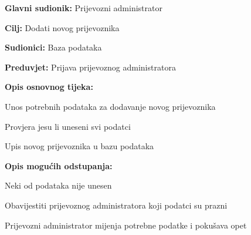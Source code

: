 			\noindent {}
			\begin{packed_item}
				
				\item \textbf{Glavni sudionik: }Prijevozni administrator
				\item  \textbf{Cilj:} Dodati novog prijevoznika
				\item  \textbf{Sudionici:} Baza podataka
				\item  \textbf{Preduvjet:} Prijava prijevoznog administratora
				\item  \textbf{Opis osnovnog tijeka:}
				
				\item[] \begin{packed_enum}
					
					\item Unos potrebnih podataka za dodavanje novog prijevoznika
					\item Provjera jesu li uneseni svi podatci
					\item Upis novog prijevoznika u bazu podataka
				\end{packed_enum}
				
				\item  \textbf{Opis mogućih odstupanja:}
				
				\item[] \begin{packed_item}
					
					\item[2.a] Neki od podataka nije unesen
					\item[] \begin{packed_enum}
						
						\item Obavijestiti prijevoznog administratora koji podatci su prazni
						\item Prijevozni administrator mijenja potrebne podatke i pokušava opet
						
					\end{packed_enum}
					
				\end{packed_item}
			\end{packed_item}
			
